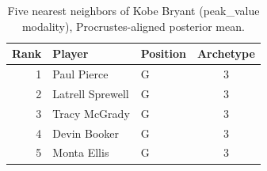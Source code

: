 \begin{table}[htbp]
  \centering\small
  \begin{tabular}{rllc}
    \toprule
    Rank & Player & Position & Archetype \\
    \midrule
    1 & Paul Pierce & G & 3 \\
    2 & Latrell Sprewell & G & 3 \\
    3 & Tracy McGrady & G & 3 \\
    4 & Devin Booker & G & 3 \\
    5 & Monta Ellis & G & 3 \\
    \bottomrule
  \end{tabular}
  \caption{Five nearest neighbors of Kobe Bryant (peak_value modality), Procrustes-aligned posterior mean.}
  \label{tab:Kobe_Bryant_neighbors_peak_value}
\end{table}

